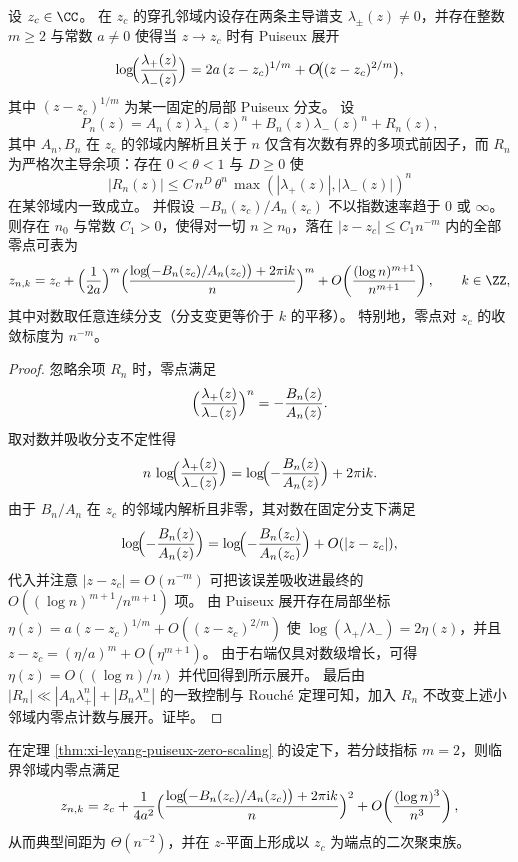 \begin{theorem}\label{thm:xi-leyang-puiseux-zero-scaling}
设 \(z_c\in\CC\)。
在 \(z_c\) 的穿孔邻域内设存在两条主导谱支 \(\lambda_{\pm}(z)\neq 0\)，并存在整数 \(m\ge 2\) 与常数 \(a\neq 0\) 使得当 \(z\to z_c\) 时有 Puiseux 展开
\[
\log\!\Bigl(\frac{\lambda_+(z)}{\lambda_-(z)}\Bigr)
=2a\,(z-z_c)^{1/m}+O\!\bigl((z-z_c)^{2/m}\bigr),
\]
其中 \((z-z_c)^{1/m}\) 为某一固定的局部 Puiseux 分支。
设
\[
P_n(z)=A_n(z)\lambda_+(z)^n+B_n(z)\lambda_-(z)^n+R_n(z),
\]
其中 \(A_n,B_n\) 在 \(z_c\) 的邻域内解析且关于 \(n\) 仅含有次数有界的多项式前因子，而 \(R_n\) 为严格次主导余项：存在 \(0<\theta<1\) 与 \(D\ge 0\) 使
\[
|R_n(z)|\le C\,n^D\,\theta^n\,\max(|\lambda_+(z)|,|\lambda_-(z)|)^n
\]
在某邻域内一致成立。
并假设 \(-B_n(z_c)/A_n(z_c)\) 不以指数速率趋于 \(0\) 或 \(\infty\)。
则存在 \(n_0\) 与常数 \(C_1>0\)，使得对一切 \(n\ge n_0\)，落在 \(|z-z_c|\le C_1 n^{-m}\) 内的全部零点可表为
\[
z_{n,k}
=z_c+\Bigl(\frac{1}{2a}\Bigr)^m\Bigl(\frac{\log\!\bigl(-B_n(z_c)/A_n(z_c)\bigr)+2\pi \mathrm{i}k}{n}\Bigr)^m
+O\!\left(\frac{(\log n)^{m+1}}{n^{m+1}}\right),
\qquad k\in\ZZ,
\]
其中对数取任意连续分支（分支变更等价于 \(k\) 的平移）。
特别地，零点对 \(z_c\) 的收敛标度为 \(n^{-m}\)。
\end{theorem}
\begin{proof}
忽略余项 \(R_n\) 时，零点满足
\[
\Bigl(\frac{\lambda_+(z)}{\lambda_-(z)}\Bigr)^n=-\frac{B_n(z)}{A_n(z)}.
\]
取对数并吸收分支不定性得
\[
n\,\log\!\Bigl(\frac{\lambda_+(z)}{\lambda_-(z)}\Bigr)=\log\!\Bigl(-\frac{B_n(z)}{A_n(z)}\Bigr)+2\pi\mathrm{i}k.
\]
由于 \(B_n/A_n\) 在 \(z_c\) 的邻域内解析且非零，其对数在固定分支下满足
\[
\log\!\Bigl(-\frac{B_n(z)}{A_n(z)}\Bigr)
=\log\!\Bigl(-\frac{B_n(z_c)}{A_n(z_c)}\Bigr)+O(|z-z_c|),
\]
代入并注意 \(|z-z_c|=O(n^{-m})\) 可把该误差吸收进最终的 \(O((\log n)^{m+1}/n^{m+1})\) 项。
由 Puiseux 展开存在局部坐标 \(\eta(z)=a(z-z_c)^{1/m}+O((z-z_c)^{2/m})\) 使
\(
\log(\lambda_+/\lambda_-)=2\eta(z)
\)，并且 \(z-z_c=(\eta/a)^m+O(\eta^{m+1})\)。
由于右端仅具对数级增长，可得 \(\eta(z)=O((\log n)/n)\) 并代回得到所示展开。
最后由 \(|R_n|\ll |A_n\lambda_+^n|+|B_n\lambda_-^n|\) 的一致控制与 Rouch\'e 定理可知，加入 \(R_n\) 不改变上述小邻域内零点计数与展开。证毕。
\end{proof}

\begin{corollary}[简单判别式点的二次聚束标度]\label{cor:xi-leyang-puiseux-m2-parabola}
在定理 \ref{thm:xi-leyang-puiseux-zero-scaling} 的设定下，若分歧指标 \(m=2\)，则临界邻域内零点满足
\[
z_{n,k}
=z_c+\frac{1}{4a^2}\Bigl(\frac{\log\!\bigl(-B_n(z_c)/A_n(z_c)\bigr)+2\pi \mathrm{i}k}{n}\Bigr)^2
+O\!\left(\frac{(\log n)^3}{n^3}\right),
\]
从而典型间距为 \(\Theta(n^{-2})\)，并在 \(z\)-平面上形成以 \(z_c\) 为端点的二次聚束族。
\end{corollary}

